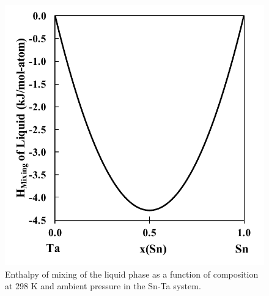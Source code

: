 \pagebreak
\begin{figure}[H]
	\centering
	\includegraphics{Chapter-4/Figures/HofMix.pdf}
	\caption{Enthalpy of mixing of the liquid phase as a function of composition at 298 K and ambient pressure in the Sn-Ta system.}
	\label{Ch4-figure:HofMix}
\end{figure}